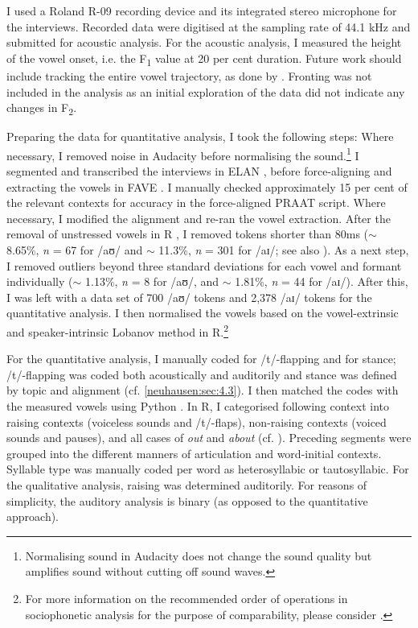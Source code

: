 \documentclass[output=paper]{langscibook}
\begin{document}
I used a Roland R-09 recording device and its integrated stereo microphone for the interviews. Recorded data were digitised at the sampling rate of 44.1 kHz and submitted for acoustic analysis. For the acoustic analysis, I measured the height of the vowel onset, i.e. the F\textsubscript{1} value at 20 per cent duration. Future work should include tracking the entire vowel trajectory, as done by \citet{moore_natural_2018}. Fronting was not included in the analysis as an initial exploration of the data did not indicate any changes in F\textsubscript{2}. 

Preparing the data for quantitative analysis, I took the following steps: Where necessary, I removed noise in Audacity \citep{ash_audacity_2015} before normalising the sound.\footnote{Normalising sound in Audacity does not change the sound quality but amplifies sound without cutting off sound waves.} I segmented and transcribed the interviews in ELAN \citep{max_planck_institute_for_psycholinguistics_elan_2019}, before force-aligning and extracting the vowels in FAVE \citep{rosenfelder_fave_2014}. I manually checked approximately 15 per cent of the relevant contexts for accuracy in the force-aligned PRAAT script. Where necessary, I modified the alignment and re-ran the vowel extraction. After the removal of unstressed vowels in R \citep{r_core_2020}, I removed tokens shorter than 80ms ($\sim$ 8.65\%, \textit{n} = 67 for /aʊ/ and $\sim$ 11.3\%, \textit{n} = 301 for /aɪ/; see also \citealt[55]{nycz_changing_2013}). As a next step, I removed outliers beyond three standard deviations for each vowel and formant individually ($\sim$ 1.13\%, \textit{n} = 8 for /aʊ/, and $\sim$ 1.81\%, \textit{n} = 44 for /aɪ/). After this, I was left with a data set of 700 /aʊ/ tokens and 2,378 /aɪ/ tokens for the quantitative analysis. I then normalised the vowels based on the vowel-extrinsic and speaker-intrinsic Lobanov method in R.\footnote{For more information on the recommended order of operations in sociophonetic analysis for the purpose of comparability, please consider \citet{stanley_order_2022}.} 

For the quantitative analysis, I manually coded for /t/-flapping and for stance; /t/-flapping was coded both acoustically and auditorily and stance was defined by topic and alignment (cf. \autoref{neuhausen:sec:4.3}). I then matched the codes with the measured vowels using Python \citep{python_software_foundation_python_2019}. In R, I categorised following context into raising contexts (voiceless sounds and /t/-flaps), non-raising contexts (voiced sounds and pauses), and all cases of \textit{out} and \textit{about} (cf. \citealt[115]{chambers_canadian_1973,moreton_origins_2007,sadlier-brown_homogeneity_2012,nycz_changing_2013}). Preceding segments were grouped into the different manners of articulation and word-initial contexts. Syllable type was manually coded per word as heterosyllabic or tautosyllabic. For the qualitative analysis, raising was determined auditorily. For reasons of simplicity, the auditory analysis is binary (as opposed to the quantitative approach).
\end{document}
